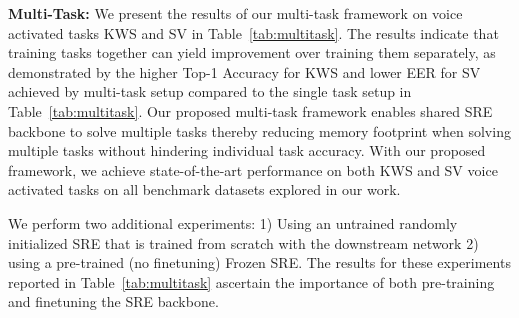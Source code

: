\documentclass{article}
\begin{document}
\noindent \textbf{Multi-Task:}
We present the results of our multi-task framework on voice activated tasks KWS and SV in Table~\ref{tab:multitask}. The results indicate that training tasks together can yield improvement over training them separately, as demonstrated by the higher Top-1 Accuracy for KWS and lower EER for SV achieved by multi-task setup compared to the single task setup in Table~\ref{tab:multitask}. 
Our proposed multi-task framework enables shared SRE backbone to solve multiple tasks thereby reducing memory footprint when solving multiple tasks without hindering individual task accuracy. 
With our proposed framework, we achieve state-of-the-art performance on both KWS and SV voice activated tasks on all benchmark datasets explored in our work. 

We perform two additional experiments: 1) Using an untrained randomly initialized SRE that is trained from scratch with the downstream network 2) using a pre-trained (no finetuning) Frozen SRE. The results for these experiments reported in Table~\ref{tab:multitask} ascertain the importance of both pre-training and finetuning the SRE backbone. 
 
\end{document}
